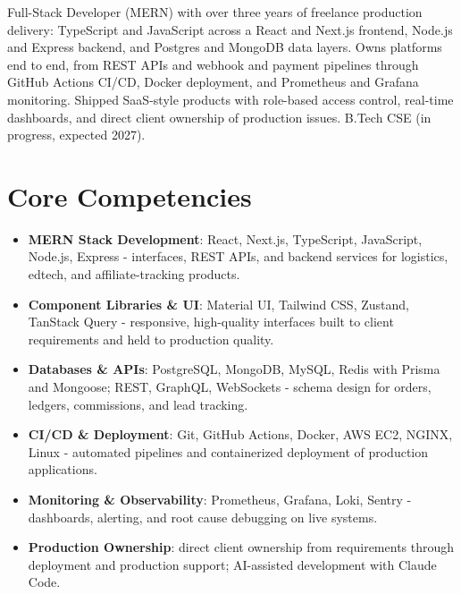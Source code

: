 \documentclass[11pt,a4paper,sans]{moderncv}
\begin{document}
\makecvtitle


\vspace{6pt}
\small{Full-Stack Developer (MERN) with over three years of freelance production delivery: TypeScript and JavaScript across a React and Next.js frontend, Node.js and Express backend, and Postgres and MongoDB data layers. Owns platforms end to end, from REST APIs and webhook and payment pipelines through GitHub Actions CI/CD, Docker deployment, and Prometheus and Grafana monitoring. Shipped SaaS-style products with role-based access control, real-time dashboards, and direct client ownership of production issues. B.Tech CSE (in progress, expected 2027).}


\section{Core Competencies}
\vspace{1pt}
\begin{itemize}

\item \textbf{MERN Stack Development}: React, Next.js, TypeScript, JavaScript, Node.js, Express - interfaces, REST APIs, and backend services for logistics, edtech, and affiliate-tracking products.

\item \textbf{Component Libraries \& UI}: Material UI, Tailwind CSS, Zustand, TanStack Query - responsive, high-quality interfaces built to client requirements and held to production quality.

\item \textbf{Databases \& APIs}: PostgreSQL, MongoDB, MySQL, Redis with Prisma and Mongoose; REST, GraphQL, WebSockets - schema design for orders, ledgers, commissions, and lead tracking.

\item \textbf{CI/CD \& Deployment}: Git, GitHub Actions, Docker, AWS EC2, NGINX, Linux - automated pipelines and containerized deployment of production applications.

\item \textbf{Monitoring \& Observability}: Prometheus, Grafana, Loki, Sentry - dashboards, alerting, and root cause debugging on live systems.

\item \textbf{Production Ownership}: direct client ownership from requirements through deployment and production support; AI-assisted development with Claude Code.

\end{itemize}
\end{document}
